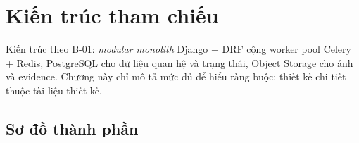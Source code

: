\chapter{Kiến trúc tham chiếu}
\label{ch:arch}

Kiến trúc theo B-01: \emph{modular monolith} Django + DRF cộng worker pool
Celery + Redis, PostgreSQL cho dữ liệu quan hệ và trạng thái, Object Storage cho
ảnh và evidence. Chương này chỉ mô tả mức đủ để hiểu ràng buộc; thiết kế chi tiết
thuộc tài liệu thiết kế.

\section{Sơ đồ thành phần}
